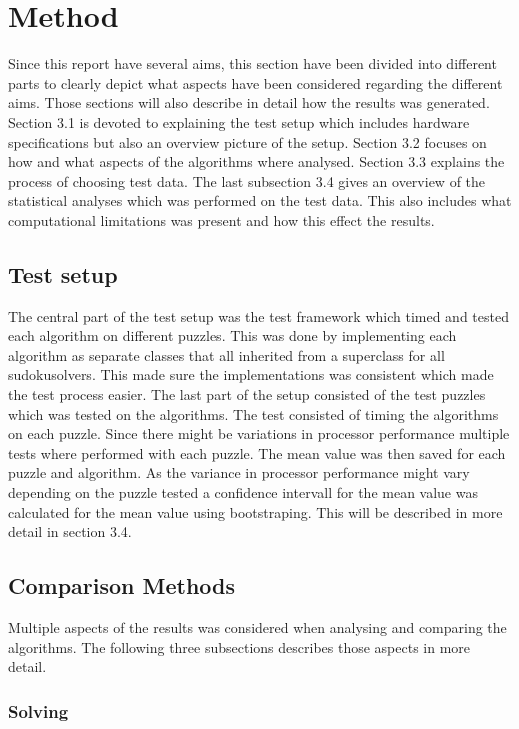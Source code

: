 \documentclass[a4paper,11pt]{kth-mag}
\begin{document}
\chapter{Method}
Since this report have several aims, this section have been divided into different parts to clearly depict what aspects have been considered regarding the different aims. 
Those sections will also describe in detail how the results was generated. 
Section 3.1 is devoted to explaining the test setup which includes hardware specifications but also an overview picture of the setup. 
Section 3.2 focuses on how and what aspects of the algorithms where analysed.
Section 3.3 explains the process of choosing test data.
The last subsection 3.4 gives an overview of the statistical analyses which was performed on the test data.
This also includes what computational limitations was present and how this effect the results. 

\section{Test setup}
The central part of the test setup was the test framework which timed and tested each algorithm on different puzzles. 
This was done by implementing each algorithm as separate classes that all inherited from a superclass for all sudokusolvers.
This made sure the implementations was consistent which made the test process easier.
The last part of the setup consisted of the test puzzles which was tested on the algorithms.
The test consisted of timing the algorithms on each puzzle. 
Since there might be variations in processor performance multiple tests where performed with each puzzle. 
The mean value was then saved for each puzzle and algorithm.
As the variance in processor performance might vary depending on the puzzle tested a confidence intervall for the mean value was calculated for the mean value using bootstraping. 
This will be described in more detail in section 3.4.

\section{Comparison Methods}
Multiple aspects of the results was considered when analysing and comparing the algorithms. The following three subsections describes those aspects in more detail. 
\subsection{Solving}
\end{document}
